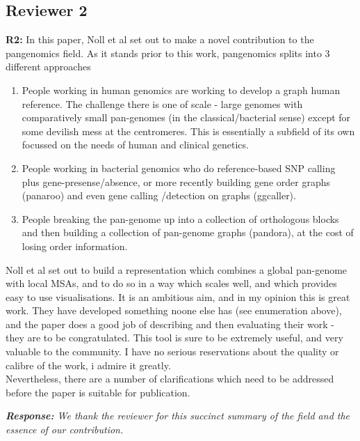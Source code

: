 \documentclass[aps,rmp,onecolumn]{revtex4-1}
\newcommand{\reviewer}[2]{\textbf{#1:} #2\vskip 5mm}
\newcommand{\response}[1]{{\it {\color{response}\textbf{Response:} #1}}\vskip 5mm}
\begin{document}
\subsection*{Reviewer 2}

\reviewer{R2}{In this paper, Noll et al set out to make a novel contribution to the pangenomics field. As it stands prior to this work, pangenomics splits into 3 different approaches

      \begin{enumerate}
            \item People working in human genomics are working to develop a graph human reference. The challenge there is one of scale - large genomes with comparatively small pan-genomes (in the classical/bacterial sense) except for some devilish mess at the centromeres. This is essentially a subfield of its own focussed on the needs of human and clinical genetics.

            \item People working in bacterial genomics who do reference-based SNP calling plus gene-presense/absence, or more recently building gene order graphs (panaroo) and even gene calling /detection on graphs (ggcaller).

            \item People breaking the pan-genome up into a collection of orthologous blocks and then building a collection of pan-genome graphs (pandora), at the cost of losing order information.
      \end{enumerate}


      Noll et al set out to build a representation which combines a global pan-genome with local MSAs, and to do so in a way which scales well, and which provides easy to use visualisations. It is an ambitious aim, and in my opinion this is great work. They have developed something noone else has (see enumeration above), and the paper does a good job of describing and then evaluating their work - they are to be congratulated. This tool is sure to be extremely useful, and very valuable to the community. I have no serious reservations about the quality or calibre of the work, i admire it greatly.\\

      Nevertheless, there are a number of clarifications which need to be addressed before the paper is suitable for publication.}

\response{We thank the reviewer for this succinct summary of the field and the essence of our contribution.}
\end{document}
